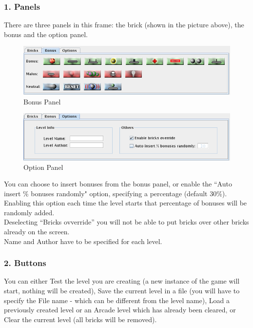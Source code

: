 \documentclass[12pt]{article}
\begin{document}
\subsubsection*{1. Panels}
There are three panels in this frame: the brick (shown in the picture above), the bonus and the option panel.\\

\begin{figure}[htbp]
  \centering
    \includegraphics[scale=0.5]{bonus.png}
  \caption{Bonus Panel}
  \label{buddies}
\end{figure}

\begin{figure}[htbp]
  \centering
    \includegraphics[scale=0.5]{options.png}
  \caption{Option Panel}
  \label{buddies}
\end{figure}

You can choose to insert bonuses from the bonus panel, or enable the ``Auto insert \% bonuses randomly" option, specifying a percentage (default 30\%). Enabling this option each time the level starts that percentage of bonuses will be randomly added.\\
Deselecting ``Bricks ovverride'' you will not be able to put bricks over other bricks already on the screen.\\
Name and Author have to be specified for each level.

\subsubsection*{2. Buttons}
You can either Test the level you are creating (a new instance of the game will start, nothing will be created), Save the current level in a file (you will have to specify the File name - which can be different from the level name), Load a previously created level or an Arcade level which has already been cleared, or Clear the current level (all bricks will be removed).
 
\end{document}
